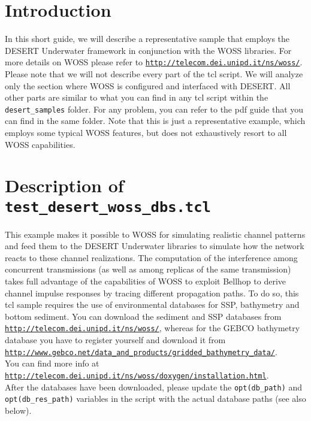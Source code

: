 \documentclass[11pt]{article}
\begin{document}
\begin{center}
    \begin{LARGE}  \end{LARGE}
\end{center}

\vspace{0.8cm}


\section{Introduction}
In this short guide, we will describe a representative sample that employs the DESERT Underwater framework in conjunction with the WOSS libraries. For more details on WOSS please refer to {\tt \url{http://telecom.dei.unipd.it/ns/woss/}}.
Please note that we will not describe every part of the tcl script. We will analyze only the section where WOSS is configured and interfaced with DESERT. All other parts are similar to what you can find in any tcl script within the {\tt desert\_samples} folder. For any problem, you can refer to the pdf guide that you can find in the same folder.
Note that this is just a representative example, which employs some typical WOSS features, but does not exhaustively resort to all WOSS capabilities.


\section{Description of {\tt test\_desert\_woss\_dbs.tcl}}

This example makes it possible to WOSS for simulating realistic channel patterns and feed them to the DESERT Underwater libraries to simulate how the network reacts to these channel realizations. The computation of the interference among concurrent transmissions (as well as among replicas of the same transmission) takes full advantage of the capabilities of WOSS to exploit Bellhop to derive channel impulse responses by tracing different propagation paths. 
To do so, this tcl sample requires the use of environmental databases for SSP, bathymetry and bottom sediment. You can download the sediment and SSP databases from {\tt \url{http://telecom.dei.unipd.it/ns/woss/}}, whereas for the GEBCO bathymetry database you have to register yourself and download it from
{\tt \url{http://www.gebco.net/data_and_products/gridded_bathymetry_data/}}.\\
You can find more info at\\
{\tt \url{http://telecom.dei.unipd.it/ns/woss/doxygen/installation.html}}.\\ 
After the databases have been downloaded, please update the {\tt opt(db\_path)} and\\{\tt opt(db\_res\_path)} variables in the script with the actual database paths (see also below).
\end{document}
